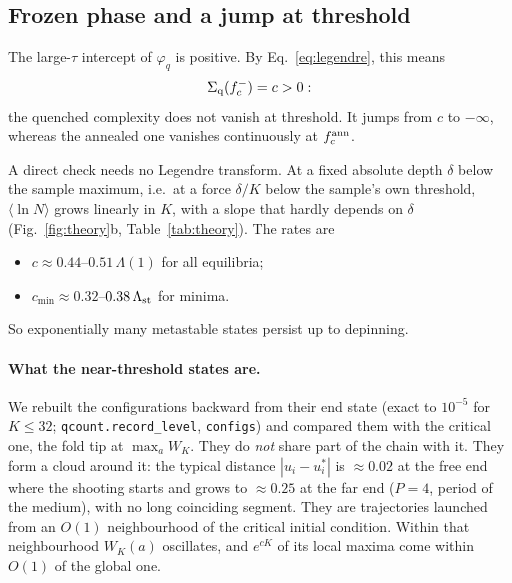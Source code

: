 \documentclass[10pt,a4paper]{article}
\newcommand{\Sq}{\Sigma_{\rm q}}
\begin{document}
\subsection{Frozen phase and a jump at threshold}\label{sec:jump}

The large-$\tau$ intercept of $\varphi_q$ is positive. By Eq.~\eqref{eq:legendre}, this means
\begin{equation}
\Sq(f_c^-)=c>0 :
\end{equation}
the quenched complexity does not vanish at threshold. It jumps from $c$ to $-\infty$, whereas the annealed one vanishes continuously at $f_c^{\rm ann}$.

A direct check needs no Legendre transform.
At a fixed absolute depth $\delta$ below the sample maximum, i.e.\ at a force $\delta/K$ below the sample's own threshold, $\langle\ln N\rangle$ grows linearly in $K$, with a slope that hardly depends on $\delta$ (Fig.~\ref{fig:theory}b, Table~\ref{tab:theory}).
The rates are
\begin{itemize}
\item $c\approx0.44$--$0.51\,\Lambda(1)$ for all equilibria;
\item $c_{\min}\approx0.32$--$0.38\,\Lambda_{\rm st}$ for minima.
\end{itemize}
So exponentially many metastable states persist up to depinning.

\paragraph{What the near-threshold states are.}
We rebuilt the configurations backward from their end state (exact to $10^{-5}$ for $K\le32$; \texttt{qcount.record\_level}, \texttt{configs}) and compared them with the critical one, the fold tip at $\max_aW_K$.
They do \emph{not} share part of the chain with it.
They form a cloud around it: the typical distance $|u_i-u_i^*|$ is $\approx0.02$ at the free end where the shooting starts and grows to $\approx0.25$ at the far end ($P=4$, period of the medium), with no long coinciding segment.
They are trajectories launched from an $O(1)$ neighbourhood of the critical initial condition. Within that neighbourhood $W_K(a)$ oscillates, and $e^{cK}$ of its local maxima come within $O(1)$ of the global one.
\end{document}
